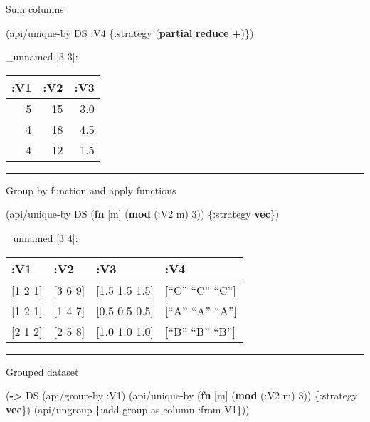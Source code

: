 \documentclass[]{article}
\newenvironment{Shaded}{\begin{snugshade}}{\end{snugshade}}
\newcommand{\KeywordTok}[1]{\textcolor[rgb]{0.13,0.29,0.53}{\textbf{#1}}}
\newcommand{\DecValTok}[1]{\textcolor[rgb]{0.00,0.00,0.81}{#1}}
\newcommand{\AttributeTok}[1]{\textcolor[rgb]{0.77,0.63,0.00}{#1}}
\newcommand{\NormalTok}[1]{#1}
\begin{document}
Sum columns

\begin{Shaded}
\begin{Highlighting}[]
\NormalTok{(api/unique-by DS }\AttributeTok{:V4}\NormalTok{ \{}\AttributeTok{:strategy}\NormalTok{ (}\KeywordTok{partial} \KeywordTok{reduce} \KeywordTok{+}\NormalTok{)\})}
\end{Highlighting}
\end{Shaded}

\_unnamed {[}3 3{]}:

\begin{longtable}[]{@{}rrr@{}}
\toprule
:V1 & :V2 & :V3\tabularnewline
\midrule
\endhead
5 & 15 & 3.0\tabularnewline
4 & 18 & 4.5\tabularnewline
4 & 12 & 1.5\tabularnewline
\bottomrule
\end{longtable}

\begin{center}\rule{0.5\linewidth}{0.5pt}\end{center}

Group by function and apply functions

\begin{Shaded}
\begin{Highlighting}[]
\NormalTok{(api/unique-by DS (}\KeywordTok{fn}\NormalTok{ [m] (}\KeywordTok{mod}\NormalTok{ (}\AttributeTok{:V2}\NormalTok{ m) }\DecValTok{3}\NormalTok{)) \{}\AttributeTok{:strategy} \KeywordTok{vec}\NormalTok{\})}
\end{Highlighting}
\end{Shaded}

\_unnamed {[}3 4{]}:

\begin{longtable}[]{@{}llll@{}}
\toprule
:V1 & :V2 & :V3 & :V4\tabularnewline
\midrule
\endhead
{[}1 2 1{]} & {[}3 6 9{]} & {[}1.5 1.5 1.5{]} & {[}``C'' ``C''
``C''{]}\tabularnewline
{[}1 2 1{]} & {[}1 4 7{]} & {[}0.5 0.5 0.5{]} & {[}``A'' ``A''
``A''{]}\tabularnewline
{[}2 1 2{]} & {[}2 5 8{]} & {[}1.0 1.0 1.0{]} & {[}``B'' ``B''
``B''{]}\tabularnewline
\bottomrule
\end{longtable}

\begin{center}\rule{0.5\linewidth}{0.5pt}\end{center}

Grouped dataset

\begin{Shaded}
\begin{Highlighting}[]
\NormalTok{(}\KeywordTok{->}\NormalTok{ DS}
\NormalTok{    (api/group-by }\AttributeTok{:V1}\NormalTok{)}
\NormalTok{    (api/unique-by (}\KeywordTok{fn}\NormalTok{ [m] (}\KeywordTok{mod}\NormalTok{ (}\AttributeTok{:V2}\NormalTok{ m) }\DecValTok{3}\NormalTok{)) \{}\AttributeTok{:strategy} \KeywordTok{vec}\NormalTok{\})}
\NormalTok{    (api/ungroup \{}\AttributeTok{:add-group-as-column} \AttributeTok{:from-V1}\NormalTok{\}))}
\end{Highlighting}
\end{Shaded}
\end{document}
